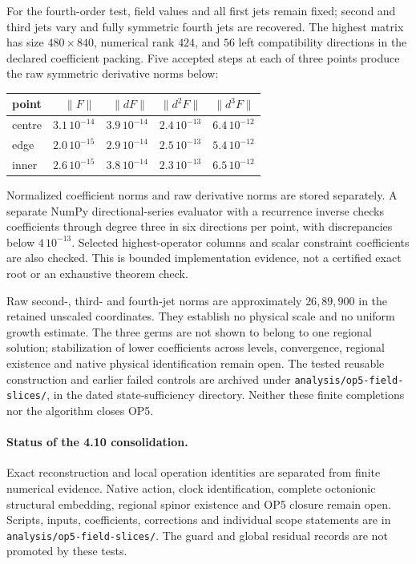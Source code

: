 For the fourth-order test, field values and all first jets remain fixed;
second and third jets vary and fully symmetric fourth jets are recovered.
The highest matrix has size \(480\times840\), numerical rank \(424\),
and \(56\) left compatibility directions in the declared coefficient
packing. Five accepted steps at each of three points produce the raw
symmetric derivative norms below:
\begin{center}
\begin{tabular}{@{}lrrrr@{}}\toprule
point & \(\|F\|\) & \(\|dF\|\) & \(\|d^2F\|\) & \(\|d^3F\|\)\\
\midrule
centre & \(3.1\,10^{-14}\) & \(3.9\,10^{-14}\) & \(2.4\,10^{-13}\) & \(6.4\,10^{-12}\)\\
edge & \(2.0\,10^{-15}\) & \(2.9\,10^{-14}\) & \(2.5\,10^{-13}\) & \(5.4\,10^{-12}\)\\
inner & \(2.6\,10^{-15}\) & \(3.8\,10^{-14}\) & \(2.3\,10^{-13}\) & \(6.5\,10^{-12}\)\\
\bottomrule\end{tabular}
\end{center}
Normalized coefficient norms and raw derivative norms are stored
separately. A separate NumPy directional-series evaluator with a
recurrence inverse checks coefficients through degree three in six
directions per point, with discrepancies below \(4\,10^{-13}\).
Selected highest-operator columns and scalar constraint coefficients
are also checked. This is bounded implementation evidence, not a
certified exact root or an exhaustive theorem check.

Raw second-, third- and fourth-jet norms are approximately \(26,89,900\)
in the retained unscaled coordinates. They establish no physical scale
and no uniform growth estimate. The three germs are not shown to belong
to one regional solution; stabilization of lower coefficients across
levels, convergence, regional existence and native physical identification
remain open. The tested reusable construction and earlier failed controls
are archived under \texttt{analysis/op5-field-slices/}, in the dated
state-sufficiency directory. Neither these finite completions nor the
algorithm closes OP5.

\paragraph{Status of the 4.10 consolidation.}
Exact reconstruction and local operation identities are separated from
finite numerical evidence. Native action, clock identification, complete
octonionic structural embedding, regional spinor existence and OP5 closure
remain open. Scripts, inputs, coefficients, corrections and individual
scope statements are in \texttt{analysis/op5-field-slices/}.
The guard and global residual records are not promoted by these tests.
